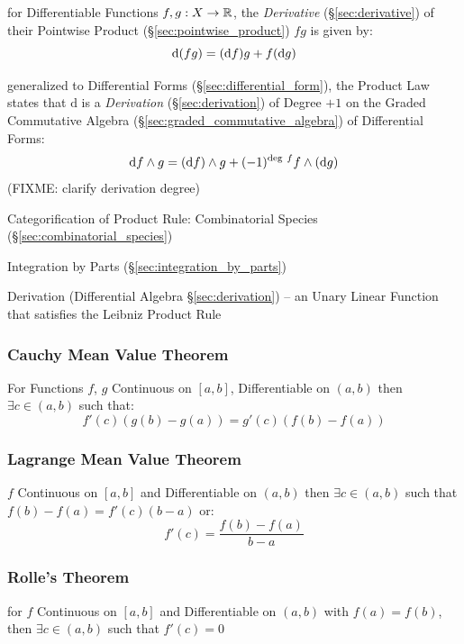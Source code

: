 {for Differentiable Functions $f, g : X \rightarrow \mathbb{R}$, the
\emph{Derivative} (\S\ref{sec:derivative}) of their Pointwise Product
(\S\ref{sec:pointwise_product}) $fg$ is given by:
\[
  \mathrm{d}(fg) = (\mathrm{d}f)g + f(\mathrm{d}g)
\]

generalized to Differential Forms (\S\ref{sec:differential_form}), the Product
Law states that $\mathrm{d}$ is a \emph{Derivation} (\S\ref{sec:derivation}) of
Degree $+1$ on the Graded Commutative Algebra
(\S\ref{sec:graded_commutative_algebra}) of Differential Forms:
\[
\mathrm{d}f \wedge g = (\mathrm{d}f) \wedge g +
  (-1)^{\mathrm{deg}\ f}f \wedge (\mathrm{d}g)
\]
(FIXME: clarify derivation degree)

Categorification of Product Rule: Combinatorial Species
(\S\ref{sec:combinatorial_species}) %

\fist Integration by Parts (\S\ref{sec:integration_by_parts})

\fist Derivation (Differential Algebra \S\ref{sec:derivation}) -- an Unary
Linear Function that satisfies the Leibniz Product Rule



\subsubsection{Cauchy Mean Value Theorem}
\label{sec:cauchy_mean_value}

For Functions $f$, $g$ Continuous on $[a,b]$, Differentiable on
$(a,b)$ then $\exists c \in (a,b)$ such that:
\[
  f'(c) (g(b) - g(a)) = g'(c) (f(b) - f(a))
\]



\subsubsection{Lagrange Mean Value Theorem}
\label{sec:lagrange_mean_value}

$f$ Continuous on $[a,b]$ and Differentiable on $(a,b)$ then $\exists
c \in (a,b)$ such that $f(b) - f(a) = f'(c)(b-a)$ or:
\[
  f'(c) = \frac{f(b) - f(a)}{b - a}
\]



\subsubsection{Rolle's Theorem}\label{sec:rolles_theorem}

for $f$ Continuous on $[a,b]$ and Differentiable on $(a,b)$ with $f(a)
= f(b)$, then $\exists c \in (a,b)$ such that $f'(c) = 0$



}
